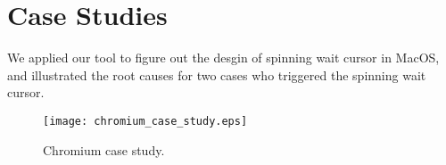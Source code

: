 \section{Case Studies} \label{sec:casestudy}
We applied our tool to figure out the desgin of spinning wait cursor in MacOS,
and illustrated the root causes for two cases who triggered the spinning wait cursor.



\begin{figure}[tb]
    \centering
    \texttt{[image: chromium\_case\_study.eps]}
    \caption{Chromium case study.}
    \label{fig:chromium-trace}
\end{figure}





